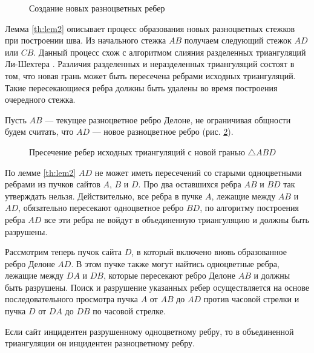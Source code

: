 \documentclass[12pt]{article}
\begin{document}
\begin{figure}[htb!]
	\caption{Создание новых разноцветных ребер}
	\label{pic:l21}
\end{figure}

Лемма \ref{th:lem2} описывает процесс образования новых разноцветных стежков при построении шва.
Из начального стежка $AB$ получаем следующий стежок $AD$ или $CB$.
Данный процесс схож с алгоритмом слияния разделенных триангуляций Ли-Шехтера \cite{Lee}.
Различия разделенных и неразделенных триангуляций состоят в том, что новая грань может быть пересечена ребрами исходных триангуляций.
Такие пересекающиеся ребра должны быть удалены во время построения очередного стежка.

Пусть $AB$ --- текущее разноцветное ребро Делоне, не ограничивая общности будем считать,
что $AD$ --- новое разноцветное ребро (рис. \ref{pic:triCorrection}).

\begin{figure}[htb!]
	\caption{Пресечение ребер исходных триангуляций с новой гранью $\triangle ABD$}
	\label{pic:triCorrection}
\end{figure}

По лемме \ref{th:lem2} $AD$ не может иметь пересечений со старыми одноцветными ребрами из пучков сайтов $A$, $B$ и $D$.
Про два оставшихся ребра $AB$ и $BD$ так утверждать нельзя.
Действительно, все ребра в пучке $A$, лежащие между $AB$ и $AD$, обязательно пересекают одноцветное ребро $BD$,
по алгоритму построения ребра $AD$ все эти ребра не войдут в объединенную триангуляцию и должны быть разрушены.

Рассмотрим теперь пучок сайта $D$, в который включено вновь образованное ребро Делоне $AD$.
В этом пучке также могут найтись одноцветные ребра, лежащие между $DA$ и $DB$, которые пересекают ребро Делоне $AB$ и должны быть разрушены.
Поиск и разрушение указанных ребер осуществляется на основе последовательного просмотра пучка $A$ от $AB$ до $AD$ против часовой стрелки и пучка $D$ от $DA$ до $DB$ по часовой стрелке.

\begin{lemma}
\label{th:lem3}
Если сайт инцидентен разрушенному одноцветному ребру, то в объединенной триангуляции он инцидентен разноцветному ребру.
\end{lemma}
\end{document}
